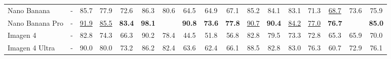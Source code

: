 \begin{table}[t]
{\begin{tabular}{lcccccccccccccccc}
Nano Banana                      & -                                  & 85.7                                 & 77.9                                 & 72.6                                 & 86.3                                 & \cellcolor[HTML]{E2E2E2}80.6                                 & 64.5                                 & 64.9                                 & 67.1                                 & 85.2                                 & 84.1                                 & 83.1                                 & 71.3                                 & {\color[HTML]{319B62} \underline{68.7}}    & \cellcolor[HTML]{E2E2E2}73.6                                 & 75.9                                 \\
Nano Banana Pro                  & -                                  & {\color[HTML]{319B62} \underline{91.9}}    & {\color[HTML]{319B62} \underline{85.5}}    & {\color[HTML]{319B62} \textbf{83.4}} & {\color[HTML]{319B62} \textbf{98.1}} & \cellcolor[HTML]{E2E2E2}{\color[HTML]{319B62} \textbf{89.7}} & {\color[HTML]{319B62} \textbf{90.8}} & {\color[HTML]{319B62} \textbf{73.6}} & {\color[HTML]{319B62} \textbf{77.8}} & {\color[HTML]{319B62} \underline{90.7}}    & {\color[HTML]{319B62} \textbf{90.4}} & {\color[HTML]{319B62} \underline{84.2}}    & {\color[HTML]{319B62} \underline{77.0}}    & {\color[HTML]{319B62} \textbf{76.7}} & \cellcolor[HTML]{E2E2E2}{\color[HTML]{319B62} \textbf{82.7}} & {\color[HTML]{319B62} \textbf{85.0}} \\
Imagen 4                         & -                                  & 82.8                                 & 74.3                                 & 66.3                                 & 90.2                                 & \cellcolor[HTML]{E2E2E2}78.4                                 & 44.5                                 & 51.8                                 & 56.8                                 & 82.8                                 & 79.5                                 & 73.3                                 & 72.8                                 & 65.3                                 & \cellcolor[HTML]{E2E2E2}65.9                                 & 70.0                                 \\
Imagen 4 Ultra                   & -                                  & 90.0                                 & 80.0                                 & 73.2                                 & 86.2                                 & \cellcolor[HTML]{E2E2E2}82.4                                 & 63.6                                 & 62.4                                 & 66.1                                 & 88.5                                 & 82.8                                 & 83.0                                 & 76.3                                 & 60.7                                 & \cellcolor[HTML]{E2E2E2}72.9                                 & 76.1                                 \\

\end{tabular}}
\end{table}
